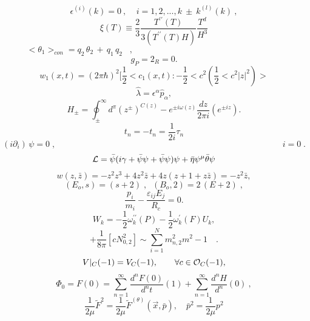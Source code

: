 \documentclass{article}
\begin{document}
$$\epsilon ^ { ( i ) } ( k ) = 0 \ , \ \ \ \ \ i = 1 , 2 , . . . , k \ \pm \ k ^ { ( l ) } ( k ) \ ,$$
$$\xi ( T ) \equiv \frac { 2 } { 3 } \frac { T ^ { \prime \prime } ( T ) } { 3 ( T ^ { \prime \prime } ( T ) H ) } \frac { T ^ { d } } { H ^ { 3 } }$$
$$< \theta _ { 1 } > _ { c o n } = q _ { 2 } \, \theta _ { 2 } \, + \, q _ { 1 } \, q _ { 2 } \, \, \, \, \, , \, \, \, \, \, \, \, \, \, \, \, \, \, \, \, \, \, \, \, \, \, \, \, \, \, \, \, \, \, \, \, \, \, \, \, \, \, \, \, \, \, \, \, \, \, \, \, \, \, \, \, \, \, \, \, \, \, \, \, \, \, \, \, \, \, \, \, \, \, \, \, \, \, \, \, \, \, \, \, \, \, \, \, \, \, \, \, \, \, \, \, \, \, \, \, \, \, \, \, \, \, \, \, \, \,$$
$$g _ { P } = 2 _ { R } = 0 .$$
$$w _ { 1 } ( x , t ) = ( 2 \pi \hbar ) ^ { 2 } [ \frac { 1 } { 2 } < c _ { 1 } ( x , t ) : - \frac { 1 } { 2 } < c ^ { 2 } ( \frac { 1 } { 2 } < c ^ { 2 } | z | ^ { 2 } ) >$$
$$\hat { \lambda } = \epsilon ^ { \alpha } \hat { p } _ { \alpha } ,$$
$$H _ { \pm } = \oint _ { \pm } ^ { \infty } d ^ { \pi } ( z ^ { \pm } ) ^ { C ( z ) } - e ^ { \pm i \omega ( z ) } \frac { d z } { 2 \pi i } \left ( e ^ { \pm i z } \right ) .$$
$$t _ { n } = - t _ { n } = \frac { 1 } { 2 i } \tau _ { n }$$
$$( i \partial _ { i } ) \, \psi = 0 \; , \; \; \; \; \; \; \; \; \; \; \; \; \; \; \; \; \; \; \; \; \; \; \; \; \; \; \; \; \; \; \; \; \; \; \; \; \; \; \; \; \; \; \; \; \; \; \; \; \; \; \; \; \; \; \; \; \; \; \; \; \; \; \; \; \; \; \; \; \; \; \; \; \; \; \; \; \; \; \; \; \; \; \; \; \; \; \; \; \; \; \; \; \; \; \; \; i = 0 \; .$$
$${ \cal L } = \bar { \psi } ( i \gamma + \bar { \psi } \psi + \bar { \psi } \psi ) \psi + \bar { \eta } \psi ^ { \mu } \bar { \theta } \psi$$
$$w ( z , \bar { z } ) = - z ^ { 2 } z ^ { 3 } + 4 z ^ { 2 } \bar { z } + 4 z ( z + 1 + z \bar { z } ) = - z ^ { 2 } \bar { z } ,$$
$$( E _ { o } , s ) = ( s + 2 ) \; , \; \; ( B _ { o } , 2 ) = 2 \, ( E + 2 ) \; ,$$
$$\frac { p _ { i } } { m _ { i } } - \frac { \varepsilon _ { i j } E _ { j } } { R _ { c } } = 0 .$$
$$W _ { k } = - \frac { 1 } { 2 } \omega _ { k } ^ { \prime \prime } ( P ) - \frac { 1 } { 2 } \omega _ { k } ^ { \prime } ( F ) U _ { k } ,$$
$$+ \frac { 1 } { 8 \pi } \left [ c N _ { 0 , 2 } ^ { 2 } \right ] \sim \sum _ { i = 1 } ^ { N } m _ { n , 2 } ^ { 2 } m ^ { 2 } - 1 \quad .$$
$$V | _ { C } ( - 1 ) = V _ { C } ( - 1 ) , \qquad \forall c \in { \cal O } _ { C } ( - 1 ) ,$$
$$\Phi _ { 0 } = F ( 0 ) = \sum _ { n = 1 } ^ { \infty } \frac { d ^ { n } F ( 0 ) } { d ^ { n } t } ( 1 ) + \sum _ { n = 1 } ^ { \infty } \frac { d ^ { n } H } { d ^ { n } } ( 0 ) \ ,$$
$$\frac { 1 } { 2 \mu } \tilde { F } ^ { 2 } = \frac { 1 } { 2 \mu } \tilde { F } ^ { ( \theta ) } ( \vec { x } , \bar { p } ) , \quad \bar { p } ^ { 2 } = \frac { 1 } { 2 \mu } p ^ { 2 }$$
\end{document}
